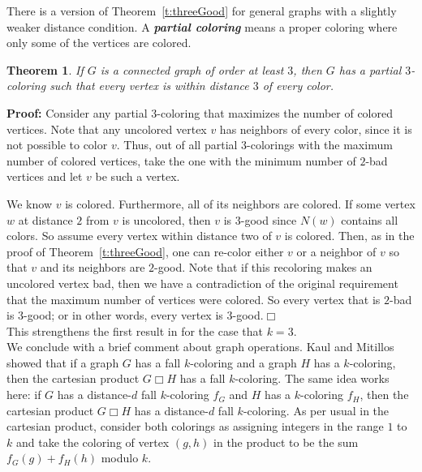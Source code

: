 \documentclass[a4paper,11pt]{article}
\newtheorem{theorem}{Theorem}[section]
\numberwithin{equation}{theorem}
\newcommand{\dd}[1]{\textbf{\textit{#1}}}
\begin{document}
There is a version of Theorem~\ref{t:threeGood} for general graphs with 
a slightly weaker distance condition. A \dd{partial coloring}
means a proper coloring where only some of the vertices are colored.

\begin{theorem} \label{t:threeGoodGeneral}
If $G$ is a connected graph of order at least $3$, then $G$ has a partial $3$-coloring
such that every vertex is within distance $3$ of every color.
\end{theorem}

{\bf Proof:} 
Consider any partial $3$-coloring that maximizes the number of colored vertices.
Note that any uncolored vertex $v$ has neighbors of every color, since it is not possible to color $v$.
Thus, out of all partial $3$-colorings with the maximum number of colored vertices, take the 
one with the minimum number of $2$-bad vertices and let $v$ be such a vertex.

We know $v$ is colored. Furthermore, all of its neighbors are colored. If some vertex $w$ at distance $2$ 
from $v$ is uncolored, then $v$ is $3$-good since $N(w)$ contains all colors. So assume every vertex within distance two of $v$ is
colored. Then, as in the proof of Theorem~\ref{t:threeGood}, one can re-color either $v$ or 
a neighbor of $v$ so that $v$ and its neighbors are $2$-good. Note that if this recoloring
makes an uncolored vertex bad, then we have a contradiction of the original requirement
that the maximum number of vertices were colored. So every vertex that is $2$-bad is
$3$-good; or in other words, every vertex is $3$-good.\hfill$\Box$\\

This strengthens the first result in \cite{BH} for the case that $k=3$.\\ 





\noindent We conclude with a brief comment about graph operations.
Kaul and Mitillos~\cite{KM} showed that if a graph $G$ has a fall $k$-coloring and a graph $H$ has a $k$-coloring,
then the cartesian product $G \Box H$ has a fall $k$-coloring. The same idea works here:
if $G$ has a distance-$d$ fall $k$-coloring $f_G$ and $H$ has a $k$-coloring $f_H$,
then the cartesian product $G \Box H$ has a distance-$d$ fall $k$-coloring.
As per usual in the cartesian product, consider both colorings as assigning
integers in the range $1$ to $k$ and take the coloring of vertex $(g,h)$ in 
the product to be the sum $f_G(g) + f_H(h)$ modulo $k$.
\end{document}
